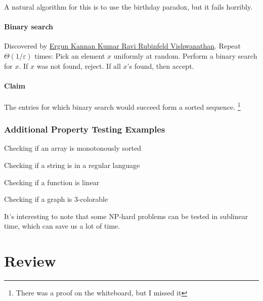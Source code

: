 \documentclass[a4paper]{article}
\newenvironment{itemize*}%
  {\begin{itemize}%
    \setlength{\itemsep}{0pt}%
    \setlength{\parsep}{0pt}%
    \setlength{\parskip}{0pt}}%
  {\end{itemize}}
\begin{document}
A natural algorithm for this is to use the birthday paradox, but it fails horribly.

\paragraph{Binary search}
Discovered by \href{http://www.cs.columbia.edu/~rocco/Teaching/S14/Readings/EKKRV-spot-checkers.pdf}{Ergun Kannan Kumar Ravi Rubinfeld Vishwanathan}.
Repeat $\Theta(1 / \varepsilon)$ times:
Pick an element $x$ uniformly at random.
Perform a binary search for $x$.
If $x$ was not found, reject.
If all $x$'s found, then accept.

\paragraph{Claim}
The entries for which binary search would succeed form a sorted sequence.
\footnote{There was a proof on the whiteboard, but I missed it}


\subsubsection{Additional Property Testing Examples}

\begin{itemize*}
  \item Checking if an array is monotonously sorted
  \item Checking if a string is in a regular language
  \item Checking if a function is linear
  \item Checking if a graph is 3-colorable
\end{itemize*}

It's interesting to note that some NP-hard problems can be tested in sublinear time, which can save us a lot of time.

\section{Review}

\end{document}
